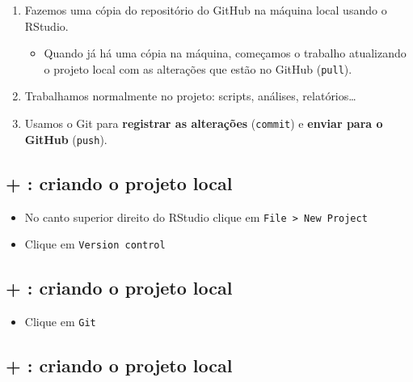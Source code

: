 \documentclass[
  letterpaper,
  DIV=11,
  numbers=noendperiod]{scrartcl}
\providecommand{\tightlist}{%
  \setlength{\itemsep}{0pt}\setlength{\parskip}{0pt}}
\begin{document}
\begin{enumerate}
\def\labelenumi{\arabic{enumi}.}
\item
  Fazemos uma cópia do repositório do GitHub na máquina local usando o
  RStudio.

  \begin{itemize}
  \tightlist
  \item
    Quando já há uma cópia na máquina, começamos o trabalho atualizando
    o projeto local com as alterações que estão no GitHub
    (\texttt{pull}).
  \end{itemize}
\item
  Trabalhamos normalmente no projeto: scripts, análises,
  relatórios\ldots{}
\item
  Usamos o Git para \textbf{registrar as alterações} (\texttt{commit}) e
  \textbf{enviar para o GitHub} (\texttt{push}).
\end{enumerate}

\subsection{\texorpdfstring{ + : criando o projeto
local}{ + : criando o projeto local}}\label{criando-o-projeto-local}

\begin{itemize}
\tightlist
\item
  No canto superior direito do RStudio clique em
  \texttt{File\ \textgreater{}\ New\ Project}
\end{itemize}

\begin{itemize}
\tightlist
\item
  Clique em \texttt{Version\ control}
\end{itemize}

\subsection{\texorpdfstring{ + : criando o projeto
local}{ + : criando o projeto local}}\label{criando-o-projeto-local-1}

\begin{itemize}
\tightlist
\item
  Clique em \texttt{Git}
\end{itemize}

\subsection{\texorpdfstring{ + : criando o projeto
local}{ + : criando o projeto local}}\label{criando-o-projeto-local-2}
\end{document}
